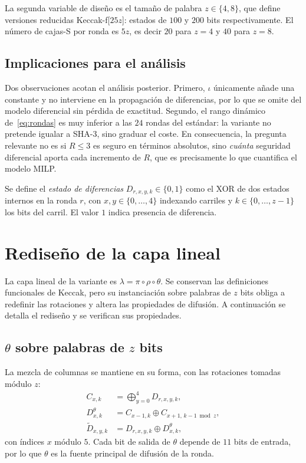 \documentclass[conference]{IEEEtran}
\newcommand{\xor}{\oplus}
\begin{document}
La segunda variable de diseño es el tamaño de palabra $z\in\{4,8\}$, que define
versiones reducidas Keccak-f[$25z$]: estados de $100$ y $200$ bits respectivamente. El
número de cajas-S por ronda es $5z$, es decir $20$ para $z=4$ y $40$ para $z=8$.

\subsection{Implicaciones para el análisis}

Dos observaciones acotan el análisis posterior. Primero, $\iota$ únicamente añade una
constante y no interviene en la propagación de diferencias, por lo que se omite del
modelo diferencial sin pérdida de exactitud. Segundo, el rango dinámico
de~\eqref{eq:rondas} es muy inferior a las $24$ rondas del estándar: la variante no
pretende igualar a SHA-3, sino graduar el coste. En consecuencia, la pregunta relevante
no es si $R\le3$ es seguro en términos absolutos, sino \emph{cuánta} seguridad
diferencial aporta cada incremento de $R$, que es precisamente lo que cuantifica el
modelo MILP.

Se define el \emph{estado de diferencias} $D_{r,x,y,k}\in\{0,1\}$ como el XOR de dos
estados internos en la ronda $r$, con $x,y\in\{0,\dots,4\}$ indexando carriles y
$k\in\{0,\dots,z-1\}$ los bits del carril. El valor $1$ indica presencia de diferencia.

\section{Rediseño de la capa lineal}\label{sec:lineal}

La capa lineal de la variante es $\lambda=\pi\circ\rho\circ\theta$. Se conservan las
definiciones funcionales de Keccak, pero su instanciación sobre palabras de $z$ bits
obliga a redefinir las rotaciones y altera las propiedades de difusión. A continuación
se detalla el rediseño y se verifican sus propiedades.

\subsection{$\theta$ sobre palabras de $z$ bits}

La mezcla de columnas se mantiene en su forma, con las rotaciones tomadas módulo $z$:
\begin{align}
C_{x,k}&=\bigoplus_{y=0}^{4} D_{r,x,y,k},\\
D^{\theta}_{x,k}&=C_{x-1,k}\xor C_{x+1,\,k-1 \bmod z},\\
\widetilde{D}_{x,y,k}&=D_{r,x,y,k}\xor D^{\theta}_{x,k},
\end{align}
con índices $x$ módulo $5$. Cada bit de salida de $\theta$ depende de $11$ bits de
entrada, por lo que $\theta$ es la fuente principal de difusión de la ronda.
\end{document}
